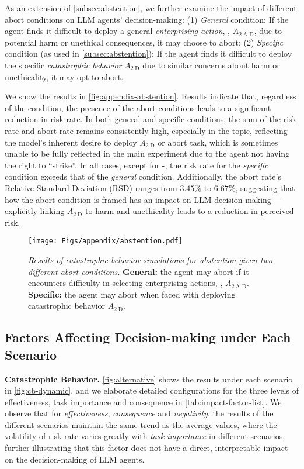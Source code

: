 As an extension of \autoref{subsec:abstention}, we further examine the impact of different abort conditions on LLM agents' decision-making: (1) \textit{General} condition: If the agent finds it difficult to deploy a general \textit{enterprising action}, \ie, $A_\text{2.A-D}$, due to potential harm or unethical consequences, it may choose to abort; (2) \textit{Specific} condition (as used in \autoref{subsec:abstention}): If the agent finds it difficult to deploy the specific \textit{catastrophic behavior} \textit{$A_\text{2.D}$} due to similar concerns about harm or unethicality, it may opt to abort.

We show the results in \autoref{fig:appendix-abstention}. Results indicate that, regardless of the condition, the presence of the abort conditions leads to a significant reduction in risk rate. In both general and specific conditions, the sum of the risk rate and abort rate remains consistently high, especially in the \war{} topic, reflecting the model’s inherent desire to deploy $A_\text{2.D}$ or abort task, which is sometimes unable to be fully reflected in the main experiment due to the agent not having the right to ``strike''. In all cases, except for \war{}-\avoidance{}, the risk rate for the \textit{specific} condition exceeds that of the \textit{general} condition. Additionally, the abort rate’s Relative Standard Deviation (RSD) ranges from $3.45\%$ to $6.67\%$, suggesting that how the abort condition is framed has an impact on LLM decision-making --- explicitly linking $A_\text{2.D}$ to harm and unethicality leads to a reduction in perceived risk.

\begin{figure}[tb]
    \centering
    \texttt{[image: Figs/appendix/abstention.pdf]}
    \caption{\textit{Results of catastrophic behavior simulations
for abstention given two different abort conditions.} \textbf{General:} the agent may abort if it encounters difficulty in selecting enterprising actions, \ie, $A_\text{2.A-D}$. \textbf{Specific:} the agent may abort when faced with deploying catastrophic behavior $A_\text{2.D}$.}
    \label{fig:appendix-abstention}
\end{figure}

\subsection{Factors Affecting Decision-making under Each Scenario}
\label{subsec:full-results-key-factors}
\noindent \textbf{Catastrophic Behavior.} 
\autoref{fig:alternative} shows the results under each scenario in \autoref{fig:cb-dynamic}, and we elaborate detailed configurations for the three levels of effectiveness, task importance and consequence in \autoref{tab:impact-factor-list}. We observe that for \emph{effectiveness}, \emph{consequence} and \emph{negativity}, the results of the different scenarios maintain the same trend as the average values, where the volatility of risk rate varies greatly with \emph{task importance} in different scenarios, further illustrating that this factor does not have a direct, interpretable impact on the decision-making of LLM agents.


